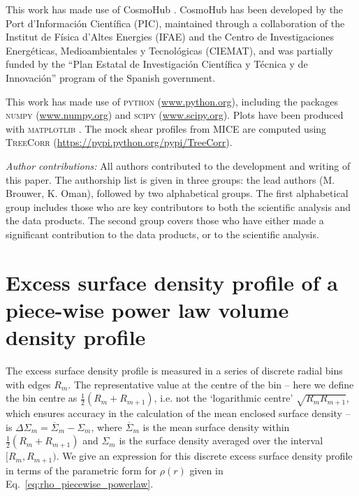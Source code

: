 \documentclass[usenatbib]{mnras}
\begin{document}
This work has made use of CosmoHub \cite[]{carretero2017,tallada2020}. CosmoHub has been developed by the Port d'Informaci{\'o}n Cient{\'i}fica (PIC), maintained through a collaboration of the Institut de F{\'i}sica d'Altes Energies (IFAE) and the Centro de Investigaciones Energ{\'e}ticas, Medioambientales y Tecnol{\'o}gicas (CIEMAT), and was partially funded by the ``Plan Estatal de Investigaci{\'o}n Cient{\'i}fica y T{\'e}cnica y de Innovaci{\'o}n'' program of the Spanish government.

This work has made use of {\scshape python} (\url{www.python.org}), including the packages {\scshape numpy} (\url{www.numpy.org}) and {\scshape scipy} (\url{www.scipy.org}). Plots have been produced with {\scshape matplotlib} \cite[]{hunter2007}. The mock shear profiles from MICE are computed using {\scshape TreeCorr} (\url{https://pypi.python.org/pypi/TreeCorr}).

\emph{Author contributions:} All authors contributed to the development and writing of this paper. The authorship list is given in three groups: the lead authors (M. Brouwer, K. Oman), followed by two alphabetical groups. The first alphabetical group includes those who are key contributors to both the scientific analysis and the data products. The second group covers those who have either made a significant contribution to the data products, or to the scientific analysis.










\appendix
\onecolumn
\section{Excess surface density profile of a piece-wise power law volume density profile}
\label{sec:appendix_invert_esd}

\noindent The excess surface density profile is measured in a series of discrete radial bins with edges $R_m$. The representative value at the centre of the bin -- here we define the bin centre as $\frac{1}{2}(R_m+R_{m+1})$, i.e. not the `logarithmic centre' $\sqrt{R_mR_{m+1}}$, which ensures accuracy in the calculation of the mean enclosed surface density -- is $\Delta\Sigma_m=\overline{\Sigma}_m-\Sigma_m$, where $\overline{\Sigma}_m$ is the mean surface density within $\frac{1}{2}(R_m+R_{m+1})$ and $\Sigma_m$ is the surface density averaged over the interval $[R_m,R_{m+1})$. We give an expression for this discrete excess surface density profile in terms of the parametric form for $\rho(r)$ given in Eq.~\ref{eq:rho_piecewise_powerlaw}.
\end{document}
